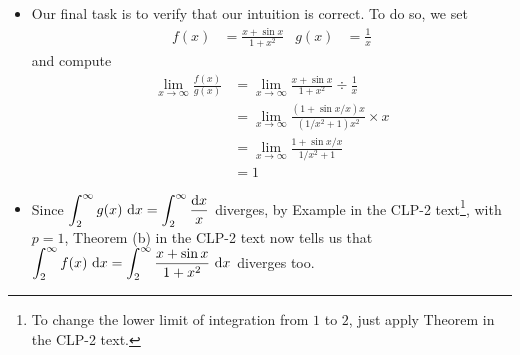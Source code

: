 \begin{solution}
\begin{description}
\begin{itemize}
\item Our final task is to verify that our intuition is correct. To do so, we
set
\begin{align*}
f(x) &= \frac{x+\sin x}{1+x^2} &
g(x) &= \frac{1}{x}
\end{align*}
and compute
\begin{align*}
\lim_{x\rightarrow\infty}\frac{f(x)}{g(x)}
&=\lim_{x\rightarrow\infty} \frac{x+\sin x}{1+x^2}\div\frac{1}{x} \\
&=\lim_{x\rightarrow\infty} \frac{(1+\sin x/x)x}{(1/x^2+1)x^2}\times x \\
&=\lim_{x\rightarrow\infty} \frac{1+\sin x/x}{1/x^2+1} \\
&=1
\end{align*}
\item Since $\displaystyle\int_2^\infty g(x)\ \dee{x} = \int_2^\infty\frac{\dee{x}}{x}$
diverges, by Example    in the
CLP-2 text\footnote{To change the lower limit of integration from $1$
to $2$, just apply Theorem   in the
CLP-2 text.},
with $p=1$,
Theorem  (b)  in the
CLP-2 text
now tells us that $\displaystyle\int_2^\infty f(x)\ \mathrm{d}x
= \int_2^\infty\frac{x+\sin x}{1+x^2}\ \mathrm{d}x$  diverges too.

\end{itemize}




\end{description}
\end{solution}
